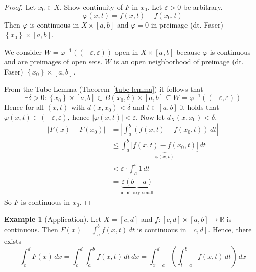 \documentclass[a4paper,landscape,twocolumn]{article}
\theoremstyle{definition}
\newtheorem{ex}{Example}
\newcommand\set[1]{\left\{#1\right\}}
\newcommand\abs[1]{\left|#1\right|}
\begin{document}
\begin{proof}
  Let $x_0 \in X$. Show continuity of $F$ in $x_0$.
  Let $\varepsilon > 0$ be arbitrary.
  \[ \varphi(x,t) = f(x,t) - f(x_0,t) \]
  Then $\varphi$ is continuous in $X \times [a,b]$ and $\varphi = 0$
  in preimage (dt. Faser) $\set{x_0} \times [a,b]$.

  We consider $W = \varphi^{-1}((-\varepsilon, \varepsilon))$ open in
  $X \times [a,b]$ because $\varphi$ is continuous and are preimages of
  open sets. $W$ is an open neighborhood of preimage (dt. Faser) $\set{x_0} \times [a,b]$.

  From the Tube Lemma (Theorem~\ref{tube-lemma}) it follows that
  \[ \exists \delta > 0: \set{x_0} \times [a,b] \subset B(x_0, \delta) \times [a,b] \subseteq W = \varphi^{-1}((-\varepsilon, \varepsilon)) \]
  Hence for all $(x,t)$ with $d(x,x_0) < \delta$ and $t \in [a,b]$ it holds that
  $\varphi(x,t) \in (-\varepsilon, \varepsilon)$, hence $\abs{\varphi(x,t)} < \varepsilon$.
  Now let $d_X(x,x_0) < \delta$,
  \begin{align*}
    \abs{F(x) - F(x_0)} &= \abs{\int_a^b \left(f(x,t) - f(x_0,t)\right) \, dt} \\
    &\leq \int_a^b \underbrace{\abs{f(x,t) - f(x_0, t)}}_{\varphi(x,t)} \, dt \\
    &< \varepsilon \cdot \int_a^b 1 \, dt \\
    &= \underbrace{\varepsilon (b - a)}_{\text{arbitrary small}}
  \end{align*}
  So $F$ is continuous in $x_0$.
\end{proof}

\begin{ex}[Application]
  Let $X = [c,d]$ and $f: [c,d] \times [a,b] \to \mathbb R$ is continuous.
  Then $F(x) = \int_a^b f(x,t) \, dt$ is continuous in $[c,d]$.
  Hence, there exists
  \[ \int_c^d F(x) \, dx = \int_c^d \int_a^b f(x,t) \, dt \, dx = \int_{x=c}^d \left( \int_{t=a}^b f(x,t) \, dt \right) \, dx \]
\end{ex}
\end{document}
